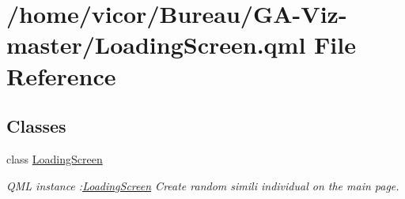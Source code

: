 \hypertarget{_loading_screen_8qml}{}\section{/home/vicor/\+Bureau/\+G\+A-\/\+Viz-\/master/\+Loading\+Screen.qml File Reference}
\label{_loading_screen_8qml}
\subsection*{Classes}
\begin{DoxyCompactItemize}
\item 
class \hyperlink{class_loading_screen}{Loading\+Screen}
\begin{DoxyCompactList}\small\item\em Q\+ML instance \+:\hyperlink{class_loading_screen}{Loading\+Screen} Create random simili individual on the main page. \end{DoxyCompactList}\end{DoxyCompactItemize}
